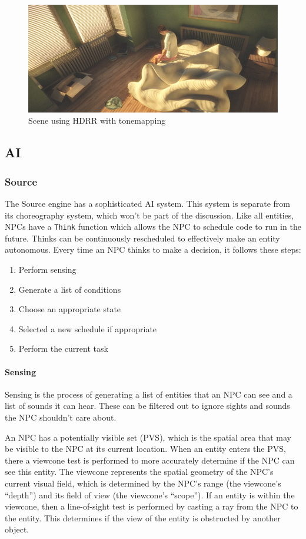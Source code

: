 \documentclass[a4paper, 12pt]{scrartcl}
\begin{document}
\begin{figure}[!ht]
  \centering
  \includegraphics[width=0.75\linewidth]{images/unity_hdrr.jpg}
  \caption{Scene using HDRR with tonemapping}
  \label{fig:unity_hdr}
\end{figure}

\subsection{AI}
\subsubsection{Source}
The Source engine has a sophisticated AI system. This system is separate from its choreography system, which won't be part of the discussion. Like all entities, NPCs have a \texttt{Think} function which allows the NPC to schedule code to run in the future. Thinks can be continuously rescheduled to effectively make an entity autonomous. Every time an NPC thinks to make a decision, it follows these steps:

\begin{enumerate}
  \item Perform sensing
  \item Generate a list of conditions
  \item Choose an appropriate state
  \item Selected a new schedule if appropriate
  \item Perform the current task
\end{enumerate}

\paragraph{Sensing}
Sensing is the process of generating a list of entities that an NPC can see and a list of sounds it can hear. These can be filtered out to ignore sights and sounds the NPC shouldn't care about.

An NPC has a potentially visible set (PVS), which is the spatial area that may be visible to the NPC at its current location. When an entity enters the PVS, there a viewcone test is performed to more accurately determine if the NPC can see this entity. The viewcone represents the spatial geometry of the NPC's current visual field, which is determined by the NPC's range (the viewcone's ``depth'') and its field of view (the viewcone's ``scope''). If an entity is within the viewcone, then a line-of-sight test is performed by casting a ray from the NPC to the entity. This determines if the view of the entity is obstructed by another object.
\end{document}
